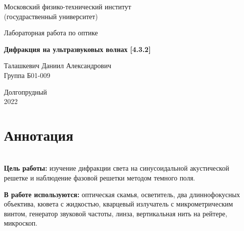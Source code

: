 \documentclass[a4paper, 12pt]{article}%
\begin{document}
\begin{titlepage}

	\newpage
	\begin{center}
		\normalsize Московский физико-технический институт \\(госудраственный 			университет)
	\end{center}

	\vspace{6em}

	\begin{center}
		\Large Лабораторная работа по оптике\\
	\end{center}

	\vspace{1em}

	\begin{center}
		\large \textbf{Дифракция на ультразвуковых волнах [4.3.2]}
	\end{center}

	\vspace{2em}

	\begin{center}
		\large Талашкевич Даниил Александрович\\
		Группа Б01-009
	\end{center}

	\vspace{\fill}

	\begin{center}
	Долгопрудный \\2022
	\end{center}
	
\end{titlepage}



	\thispagestyle{empty}
	\newpage
	\tableofcontents
	\newpage
	\setcounter{page}{1}
	
	\section{Аннотация}	

$ $\\

	\textbf{Цель работы:} изучение дифракции света на синусоидальной акустической решетке и наблюдение фазовой решетки методом темного поля.
	
	\textbf{В работе используются:} оптическая скамья, осветитель, два длиннофокусных объектива, кювета с жидкостью, кварцевый излучатель с микрометрическим винтом, генератор звуковой частоты, линза, вертикальная нить на рейтере, микроскоп.
	
\end{document}
